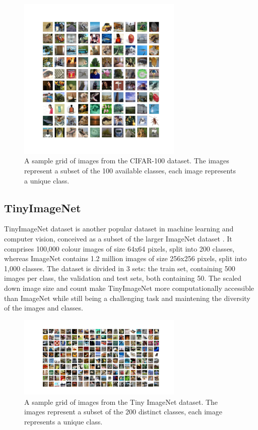 \begin{figure}[ht!]
  \centering
  \includegraphics[width=0.7\textwidth]{chapter_dlo/assets/cifar-100_example.png}
  \caption{A sample grid of images from the CIFAR-100 dataset. The images
    represent a subset of the 100 available classes, each image represents
    a unique class.}
  \label{fig:intro:cifar100_examples}
\end{figure}


\subsection{TinyImageNet}

TinyImageNet dataset is another popular dataset
in machine learning and computer vision, conceived as a subset of the larger
ImageNet dataset \cite{DBLP:journals/ijcv/RussakovskyDSKS15}. It comprises
100,000 colour images of size 64x64 pixels, split into 200 classes, whereas
ImageNet contains 1.2 million images of size 256x256 pixels, split into 1,000
classes. The dataset is divided in 3 sets: the train set, containing 500
images per class, the validation and test sets, both containing 50. The scaled
down image size and count make TinyImageNet more computationally accessible than
ImageNet while still being a challenging task and maintening the diversity of
the images and classes.\\


\begin{figure}[ht!]
  \centering
  \includegraphics[width=0.7\textwidth]{chapter_dlo/assets/tinyimagenet_example.png}
  \caption{A sample grid of images from the Tiny ImageNet dataset. The images
    represent a subset of the 200 distinct classes, each image represents a
    unique class.}
  \label{fig:intro:tinyimagenet_examples}
\end{figure}

